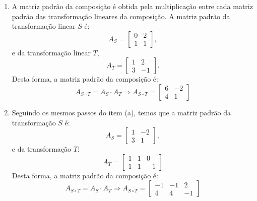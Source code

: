 \begin{resolution}
  \vspace{-24pt}
  \begin{enumerate}[label=\alph*)]
    \item A matriz padrão da composição é obtida pela multiplicação entre cada matriz padrão das transformação lineares da composição. A matriz padrão da transformação linear $S$ é:
          \begin{equation}
            A_S =\begin{bmatrix}
              0 & 2 \\
              1 & 1
            \end{bmatrix},
          \end{equation}
          e da transformação linear $T$,
          \begin{equation}
            A_T = \begin{bmatrix}
              1 & 2  \\
              3 & -1
            \end{bmatrix}.
          \end{equation}
          Desta forma, a matriz padrão da composição é:
          \begin{equation}
            A_{S \circ T} = A_S \cdot A_T \Rightarrow A_{S \circ T} = \begin{bmatrix}
              6 & -2 \\ 4 & 1
            \end{bmatrix}
          \end{equation}

    \item Seguindo os mesmos passos do item (a), temos que a matriz padrão da transformação $S$ é:
          \begin{equation}
            A_S = \begin{bmatrix}
              1 & -2 \\
              3 & 1
            \end{bmatrix},
          \end{equation}
          e da transformação $T$:
          \begin{equation}
            A_T = \begin{bmatrix}
              1 & 1 & 0 \\ 1 & 1 & -1
            \end{bmatrix}
          \end{equation}
          Desta forma, a matriz padrão da composição é:
          \begin{equation}
            A_{S \circ T} = A_S \cdot A_T \Rightarrow A_{S \circ T} = \begin{bmatrix}
              -1 & -1 & 2 \\ 4 & 4 & -1
            \end{bmatrix}
          \end{equation}


\end{enumerate}
\end{resolution}
